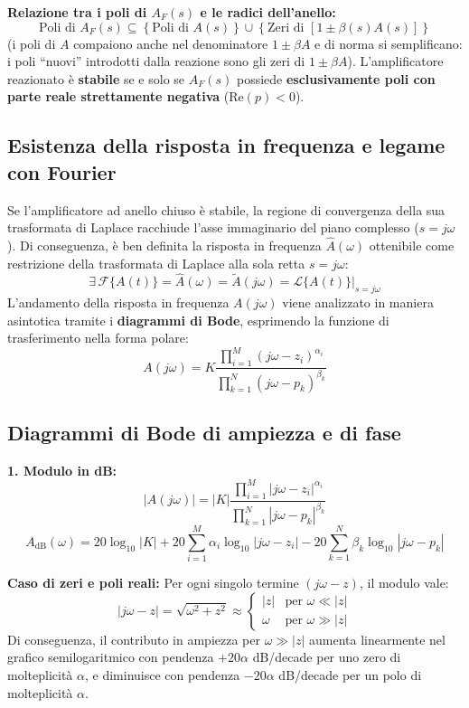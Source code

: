 \begin{important}
\textbf{Relazione tra i poli di $A_F(s)$ e le radici dell'anello:}
\[
    \text{Poli di } A_F(s) \subseteq \left\{ \text{Poli di } A(s) \right\} \cup \left\{ \text{Zeri di } [1 \pm \beta(s)A(s)] \right\}
\]
(i poli di $A$ compaiono anche nel denominatore $1\pm\beta A$ e di norma si semplificano: i poli ``nuovi'' introdotti dalla reazione sono gli zeri di $1\pm\beta A$). L'amplificatore reazionato è \textbf{stabile} se e solo se $A_F(s)$ possiede \textbf{esclusivamente poli con parte reale strettamente negativa} ($\text{Re}(p) < 0$).
\end{important}

\subsection{Esistenza della risposta in frequenza e legame con Fourier}

Se l'amplificatore ad anello chiuso è stabile, la regione di convergenza della sua trasformata di Laplace racchiude l'asse immaginario del piano complesso ($s = j\omega$). Di conseguenza, è ben definita la risposta in frequenza $\hat{A}(\omega)$ ottenibile come restrizione della trasformata di Laplace alla sola retta $s = j\omega$:
\[
    \exists \, \mathcal{F}\{A(t)\} = \hat{A}(\omega) = \tilde{A}(j\omega) = \left. \mathcal{L}\{A(t)\} \right|_{s = j\omega}
\]
L'andamento della risposta in frequenza $A(j\omega)$ viene analizzato in maniera asintotica tramite i \textbf{diagrammi di Bode}, esprimendo la funzione di trasferimento nella forma polare:
\[
    A(j\omega) = K \frac{\prod_{i=1}^{M} (j\omega - z_i)^{\alpha_i}}{\prod_{k=1}^{N} (j\omega - p_k)^{\beta_k}}
\]

\subsection{Diagrammi di Bode di ampiezza e di fase}

\textbf{1. Modulo in dB:}
\[
    |A(j\omega)| = |K| \frac{\prod_{i=1}^{M} |j\omega - z_i|^{\alpha_i}}{\prod_{k=1}^{N} |j\omega - p_k|^{\beta_k}}
\]
\[
    A_{\text{dB}}(\omega) = 20 \log_{10}|K| + 20 \sum_{i=1}^{M} \alpha_i \log_{10}|j\omega - z_i| - 20 \sum_{k=1}^{N} \beta_k \log_{10}|j\omega - p_k|
\]

\textbf{Caso di zeri e poli reali:}
Per ogni singolo termine $(j\omega - z)$, il modulo vale:
\[
    |j\omega - z| = \sqrt{\omega^2 + z^2} \approx \begin{cases} 
        |z| & \text{per } \omega \ll |z| \\[0.3em]
        \omega & \text{per } \omega \gg |z| 
    \end{cases}
\]
Di conseguenza, il contributo in ampiezza per $\omega \gg |z|$ aumenta linearmente nel grafico semilogaritmico con pendenza $+20\alpha$ dB/decade per uno zero di molteplicità $\alpha$, e diminuisce con pendenza $-20\alpha$ dB/decade per un polo di molteplicità $\alpha$.

